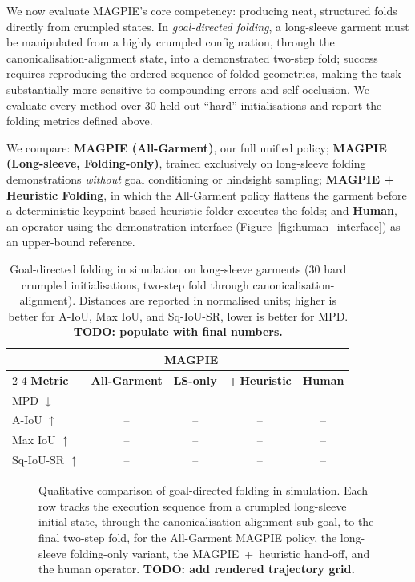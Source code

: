 \documentclass[journal]{IEEEtran}
\begin{document}
We now evaluate MAGPIE's core competency: producing neat, structured folds directly from crumpled states. In \textit{goal-directed folding}, a long-sleeve garment must be manipulated from a highly crumpled configuration, through the canonicalisation-alignment state, into a demonstrated two-step fold; success requires reproducing the ordered sequence of folded geometries, making the task substantially more sensitive to compounding errors and self-occlusion. We evaluate every method over 30 held-out ``hard'' initialisations and report the folding metrics defined above.

We compare: \textbf{MAGPIE (All-Garment)}, our full unified policy; \textbf{MAGPIE (Long-sleeve, Folding-only)}, trained exclusively on long-sleeve folding demonstrations \emph{without} goal conditioning or hindsight sampling; \textbf{MAGPIE + Heuristic Folding}, in which the All-Garment policy flattens the garment before a deterministic keypoint-based heuristic folder \cite{canberk2022cloth, xue2023unifolding} executes the folds; and \textbf{Human}, an operator using the demonstration interface (Figure~\ref{fig:human_interface}) as an upper-bound reference.

\begin{table}[!t]
\caption{Goal-directed folding in simulation on long-sleeve garments (30 hard crumpled initialisations, two-step fold through canonicalisation-alignment). Distances are reported in normalised units; higher is better for A-IoU, Max IoU, and Sq-IoU-SR, lower is better for MPD. \textbf{TODO: populate with final numbers.}}
\label{tab:sim-folding}
\centering
\small
\begin{tabular}{l|ccc||c}
\toprule
 & \multicolumn{3}{c||}{\textbf{MAGPIE}} & \\
\cmidrule(lr){2-4}
\textbf{Metric} & \textbf{All-Garment} & \textbf{LS-only} & \textbf{+\,Heuristic} & \textbf{Human} \\
\midrule
MPD $\downarrow$        & -- & -- & -- & -- \\
A-IoU $\uparrow$        & -- & -- & -- & -- \\
Max IoU $\uparrow$      & -- & -- & -- & -- \\
Sq-IoU-SR $\uparrow$    & -- & -- & -- & -- \\
\bottomrule
\end{tabular}
\end{table}

\begin{figure}[!t]
    \centering
    \caption{Qualitative comparison of goal-directed folding in simulation. Each row tracks the execution sequence from a crumpled long-sleeve initial state, through the canonicalisation-alignment sub-goal, to the final two-step fold, for the All-Garment MAGPIE policy, the long-sleeve folding-only variant, the MAGPIE~+~heuristic hand-off, and the human operator. \textbf{TODO: add rendered trajectory grid.}}
    \label{fig:qualitative_folding}
\end{figure}
\end{document}
